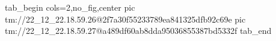  
 
 
 
 

\qqSecOrig


\ifcmt
  tab_begin cols=2,no_fig,center
    pic tm://22_12_22.18.59.26@2f7a30f55233789ea841325dfb92c69e
    pic tm://22_12_22.18.59.27@a489df60ab8dda95036855387bd5332f
  tab_end
\fi

